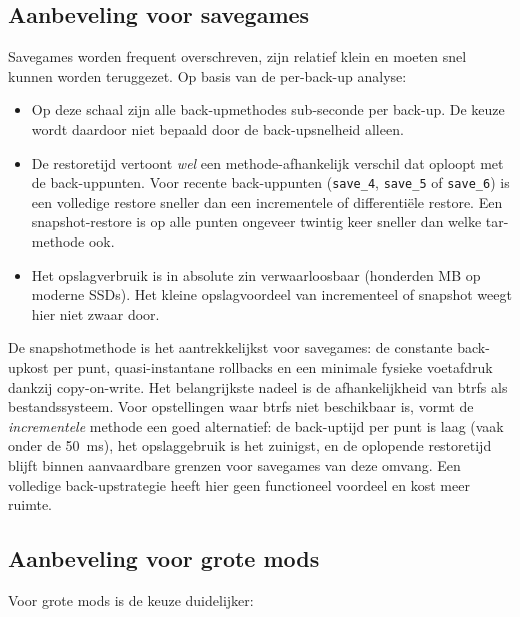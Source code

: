 \subsection{Aanbeveling voor savegames}

Savegames worden frequent overschreven, zijn relatief klein en moeten snel kunnen worden teruggezet. Op basis van de per-back-up analyse:

\begin{itemize}
    \item Op deze schaal zijn alle back-upmethodes sub-seconde per back-up. De keuze wordt daardoor niet bepaald door de back-upsnelheid alleen.
    \item De restoretijd vertoont \emph{wel} een methode-afhankelijk verschil dat oploopt met de back-uppunten. Voor recente back-uppunten (\texttt{save\_4}, \texttt{save\_5} of \texttt{save\_6}) is een volledige restore sneller dan een incrementele of differentiële restore. Een snapshot-restore is op alle punten ongeveer twintig keer sneller dan welke tar-methode ook.
    \item Het opslagverbruik is in absolute zin verwaarloosbaar (honderden MB op moderne SSDs). Het kleine opslagvoordeel van incrementeel of snapshot weegt hier niet zwaar door.
\end{itemize}

De snapshotmethode is het aantrekkelijkst voor savegames: de constante back-upkost per punt, quasi-instantane rollbacks en een minimale fysieke voetafdruk dankzij copy-on-write. Het belangrijkste nadeel is de afhankelijkheid van btrfs als bestandssysteem. Voor opstellingen waar btrfs niet beschikbaar is, vormt de \emph{incrementele} methode een goed alternatief: de back-uptijd per punt is laag (vaak onder de 50~ms), het opslaggebruik is het zuinigst, en de oplopende restoretijd blijft binnen aanvaardbare grenzen voor savegames van deze omvang. Een volledige back-upstrategie heeft hier geen functioneel voordeel en kost meer ruimte.

\subsection{Aanbeveling voor grote mods}

Voor grote mods is de keuze duidelijker:

